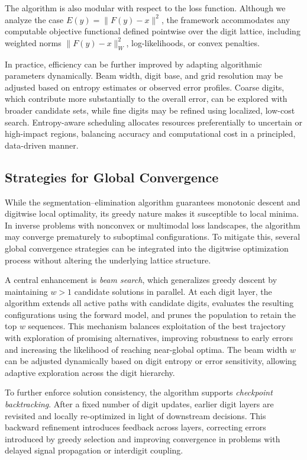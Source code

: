 \documentclass[aps,twocolumn,superscriptaddress,nofootinbib]{revtex4}
\begin{document}
The algorithm is also modular with respect to the loss function. Although we analyze the case $E(y) = \|F(y) - x\|^2$, the framework accommodates any computable objective functional defined pointwise over the digit lattice, including weighted norms $\|F(y) - x\|^2_W$, log-likelihoods, or convex penalties.

In practice, efficiency can be further improved by adapting algorithmic parameters dynamically. Beam width, digit base, and grid resolution may be adjusted based on entropy estimates or observed error profiles. Coarse digits, which contribute more substantially to the overall error, can be explored with broader candidate sets, while fine digits may be refined using localized, low-cost search. Entropy-aware scheduling allocates resources preferentially to uncertain or high-impact regions, balancing accuracy and computational cost in a principled, data-driven manner.

\subsection{Strategies for Global Convergence}
While the segmentation--elimination algorithm guarantees monotonic descent and digitwise local optimality, its greedy nature makes it susceptible to local minima. In inverse problems with nonconvex or multimodal loss landscapes, the algorithm may converge prematurely to suboptimal configurations. To mitigate this, several global convergence strategies can be integrated into the digitwise optimization process without altering the underlying lattice structure.

A central enhancement is \emph{beam search}, which generalizes greedy descent by maintaining $w > 1$ candidate solutions in parallel. At each digit layer, the algorithm extends all active paths with candidate digits, evaluates the resulting configurations using the forward model, and prunes the population to retain the top $w$ sequences. This mechanism balances exploitation of the best trajectory with exploration of promising alternatives, improving robustness to early errors and increasing the likelihood of reaching near-global optima. The beam width $w$ can be adjusted dynamically based on digit entropy or error sensitivity, allowing adaptive exploration across the digit hierarchy.

To further enforce solution consistency, the algorithm supports \emph{checkpoint backtracking}. After a fixed number of digit updates, earlier digit layers are revisited and locally re-optimized in light of downstream decisions. This backward refinement introduces feedback across layers, correcting errors introduced by greedy selection and improving convergence in problems with delayed signal propagation or interdigit coupling.
\end{document}
